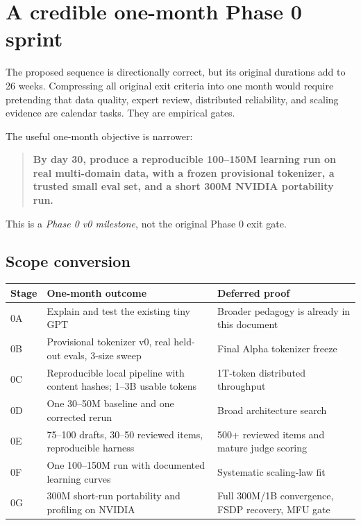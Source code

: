 \clearpage
\section{A credible one-month Phase 0 sprint}

The proposed sequence is directionally correct, but its original durations add
to 26 weeks. Compressing all original exit criteria into one month would require
pretending that data quality, expert review, distributed reliability, and
scaling evidence are calendar tasks. They are empirical gates.

The useful one-month objective is narrower:

\begin{quote}
  \textbf{By day 30, produce a reproducible 100--150M learning run on real
  multi-domain data, with a frozen provisional tokenizer, a trusted small eval
  set, and a short 300M NVIDIA portability run.}
\end{quote}

This is a \emph{Phase 0 v0 milestone}, not the original Phase 0 exit gate.

\subsection{Scope conversion}

\begin{center}
\renewcommand{\arraystretch}{1.2}
\small
\begin{tabular}{@{}p{}p{}p{}@{}}
  \textbf{Stage} & \textbf{One-month outcome} & \textbf{Deferred proof} \\
  \hline
  0A & Explain and test the existing tiny GPT & Broader pedagogy is already in this document \\
  0B & Provisional tokenizer v0, real held-out evals, 3-size sweep & Final Alpha tokenizer freeze \\
  0C & Reproducible local pipeline with content hashes; 1--3B usable tokens & 1T-token distributed throughput \\
  0D & One 30--50M baseline and one corrected rerun & Broad architecture search \\
  0E & 75--100 drafts, 30--50 reviewed items, reproducible harness & 500+ reviewed items and mature judge scoring \\
  0F & One 100--150M run with documented learning curves & Systematic scaling-law fit \\
  0G & 300M short-run portability and profiling on NVIDIA & Full 300M/1B convergence, FSDP recovery, MFU gate
\end{tabular}
\end{center}

